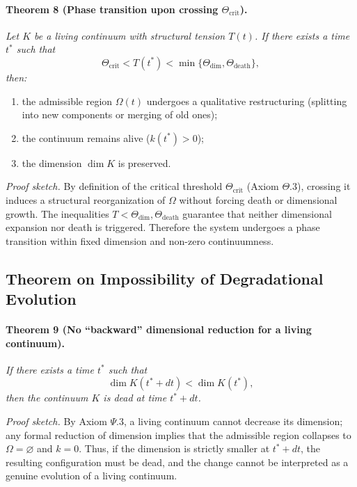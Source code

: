 \paragraph{Theorem 8 (Phase transition upon crossing \(\Theta_{\mathrm{crit}}\)).}
\emph{Let \(K\) be a living continuum with structural tension \(T(t)\).
If there exists a time \(t^*\) such that}
\[
  \Theta_{\mathrm{crit}} < T(t^*) < \min\{\Theta_{\mathrm{dim}},\Theta_{\mathrm{death}}\},
\]
\emph{then:}
\begin{enumerate}
  \item the admissible region \(\Omega(t)\) undergoes a qualitative restructuring (splitting into new components or merging of old ones);
  \item the continuum remains alive (\(k(t^*)>0\));
  \item the dimension \(\dim K\) is preserved.
\end{enumerate}

\emph{Proof sketch.}
By definition of the critical threshold \(\Theta_{\mathrm{crit}}\) (Axiom \(\Theta.3\)), crossing it induces a structural reorganization of \(\Omega\) without forcing death or dimensional growth.
The inequalities \(T<\Theta_{\mathrm{dim}},\Theta_{\mathrm{death}}\) guarantee that neither dimensional expansion nor death is triggered.
Therefore the system undergoes a phase transition within fixed dimension and non-zero continuumness.

\subsection{Theorem on Impossibility of Degradational Evolution}

\paragraph{Theorem 9 (No ``backward'' dimensional reduction for a living continuum).}
\emph{If there exists a time \(t^*\) such that}
\[
  \dim K(t^*+dt) < \dim K(t^*),
\]
\emph{then the continuum \(K\) is dead at time \(t^*+dt\).}

\emph{Proof sketch.}
By Axiom \(\Psi.3\), a living continuum cannot decrease its dimension; any formal reduction of dimension implies that the admissible region collapses to \(\Omega=\varnothing\) and \(k=0\).
Thus, if the dimension is strictly smaller at \(t^*+dt\), the resulting configuration must be dead, and the change cannot be interpreted as a genuine evolution of a living continuum.
